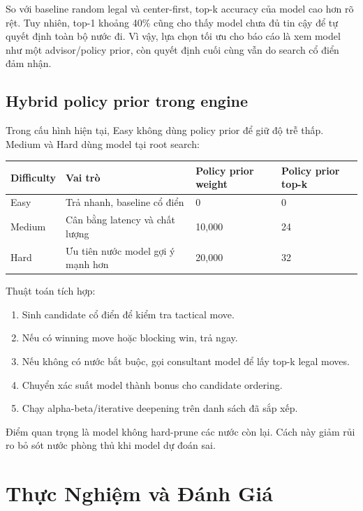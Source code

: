 \documentclass[12pt,a4paper]{article}
\begin{document}
So với baseline random legal và center-first, top-k accuracy của model cao hơn rõ rệt. Tuy nhiên, top-1 khoảng 40\% cũng cho thấy model chưa đủ tin cậy để tự quyết định toàn bộ nước đi. Vì vậy, lựa chọn tối ưu cho báo cáo là xem model như một advisor/policy prior, còn quyết định cuối cùng vẫn do search cổ điển đảm nhận.

\subsection{Hybrid policy prior trong engine}

Trong cấu hình hiện tại, Easy không dùng policy prior để giữ độ trễ thấp. Medium và Hard dùng model tại root search:

\begin{longtable}{p{}p{}p{}p{}}
\toprule
\textbf{Difficulty} & \textbf{Vai trò} & \textbf{Policy prior weight} & \textbf{Policy prior top-k} \\
\midrule
Easy & Trả nhanh, baseline cổ điển & 0 & 0 \\
Medium & Cân bằng latency và chất lượng & 10,000 & 24 \\
Hard & Ưu tiên nước model gợi ý mạnh hơn & 20,000 & 32 \\
\bottomrule
\end{longtable}

Thuật toán tích hợp:

\begin{enumerate}[leftmargin=*]
  \item Sinh candidate cổ điển để kiểm tra tactical move.
  \item Nếu có winning move hoặc blocking win, trả ngay.
  \item Nếu không có nước bắt buộc, gọi consultant model để lấy top-k legal moves.
  \item Chuyển xác suất model thành bonus cho candidate ordering.
  \item Chạy alpha-beta/iterative deepening trên danh sách đã sắp xếp.
\end{enumerate}

Điểm quan trọng là model không hard-prune các nước còn lại. Cách này giảm rủi ro bỏ sót nước phòng thủ khi model dự đoán sai.

\section{Thực Nghiệm và Đánh Giá}
\label{sec:experiment}
\end{document}
